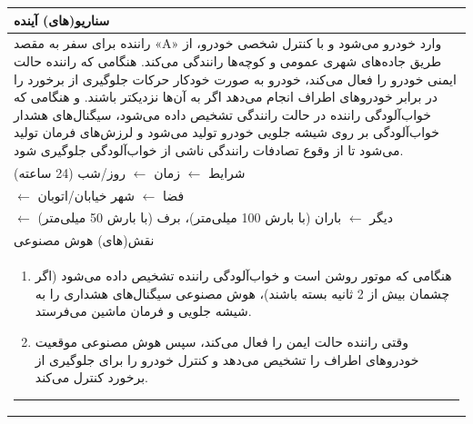 \documentclass[a4paper,10pt]{article}
\begin{document}
\begin{table}[htbp]
\begin{tabularx}{\textwidth}{X}
                    \hline
                    
                    سناریو(های) آینده \\

                    \hline

                    راننده برای سفر به مقصد «A» وارد خودرو می‌شود و با کنترل شخصی خودرو، از طریق جاده‌های شهری عمومی و کوچه‌ها رانندگی می‌کند. هنگامی که راننده حالت ایمنی خودرو را فعال می‌کند، خودرو به صورت خودکار حرکات جلوگیری از برخورد را در برابر خودروهای اطراف انجام می‌دهد اگر به آن‌ها نزدیکتر باشند. و هنگامی که خواب‌آلودگی راننده در حالت رانندگی تشخیص داده می‌شود، سیگنال‌های هشدار خواب‌آلودگی بر روی شیشه جلویی خودرو تولید می‌شود و لرزش‌های فرمان تولید می‌شود تا از وقوع تصادفات رانندگی ناشی از خواب‌آلودگی جلوگیری شود. \\

                    شرایط $\leftarrow$ زمان $\leftarrow$ روز/شب (24 ساعته) \\
                    \hspace{24pt} $\leftarrow$ فضا $\leftarrow$ شهر خیابان/اتوبان \\
                    \hspace{24pt} $\leftarrow$ دیگر $\leftarrow$ باران (با بارش 100 میلی‌متر)، برف (با بارش 50 میلی‌متر) \\

                    \hline

                    نقش(های) هوش مصنوعی \\

                    \hline

                    \vspace{-10pt}

                    \begin{enumerate}
                        
                        \item هنگامی که موتور روشن است و خواب‌آلودگی راننده تشخیص داده می‌شود (اگر چشمان بیش از 2 ثانیه بسته باشند)، هوش مصنوعی سیگنال‌های هشداری را به شیشه جلویی و فرمان ماشین می‌فرستد.

                        \item وقتی راننده حالت ایمن را فعال می‌کند، سپس هوش مصنوعی موقعیت خودروهای اطراف را تشخیص می‌دهد و کنترل خودرو را برای جلوگیری از برخورد کنترل می‌کند.

                    \end{enumerate}

                    \hrule

                \end{tabularx}
                
            \end{table}
\end{document}
